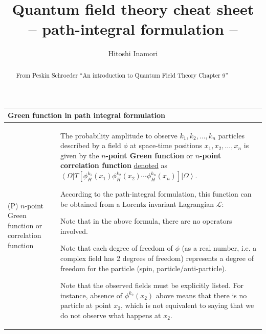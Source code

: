 \documentclass[11pt,amsmath,amssymb,latexsym]{article}
\newcommand{\toshTableBegin} 			{\begin{tabular}{|p{5cm}|p{11cm}|}}
\newcommand{\toshTableEnd} 				{\hline \end{tabular}}
\newcommand{\toshTableTitle}[1] 	{\hline \multicolumn{2}{|l|}{{\bf{#1}}}\\ \hline}
\newcommand{\toshProperty}[2]			{\hline (P) {#1} & {#2} \\}
\newcommand{\toshDef}[1]				{{\textbf{#1}}}
\newcommand{\toshD}							{{\mathcal{D}}}
\newcommand{\toshL}							{{\mathcal{L}}}
\newcommand{\bra}[1]{\left<{#1}\right|}
\newcommand{\ket}[1]{\left|{#1}\right>}
\begin{document}
\title{Quantum field theory cheat sheet\\ -- path-integral formulation -- }
\author{Hitoshi Inamori}
\maketitle
\begin{abstract}
From Peskin Schroeder ``An introduction to Quantum Field Theory Chapter 9''
\end{abstract}



\toshTableBegin
\toshTableTitle{Green function in path integral formulation}
\toshProperty{$n$-point Green function or correlation function}{The probability amplitude to observe $k_1, k_2, \ldots, k_n$ particles described by a field $\phi$ at space-time positions $x_1, x_2, \ldots, x_n$ is given by the \toshDef{$n$-point Green function} or \toshDef{$n$-point correlation function} \underline{denoted} as $\bra{\Omega} T\left[ \phi_H^{k_1}(x_1)\phi_H^{k_2}(x_2)\cdots\phi_H^{k_n}(x_n)\right]\ket{\Omega}$. 

\smallskip

According to the path-integral formulation, this function can be obtained from a Lorentz invariant Lagrangian $\toshL$:

\bigskip

\quad \framebox{\quad$\displaystyle \frac{\displaystyle\int\toshD\phi\, \phi^{k_1}(x_1)\phi^{k_2}(x_2)\cdots\phi^{k_n}(x_n) \exp\left[i\int d^4 x \toshL(\phi,\partial_\mu \phi)\right]}{\displaystyle\int\toshD\phi\, \exp\left[i\int d^4 x \toshL(\phi,\partial_\mu \phi)\right]}$\quad}

\bigskip

Note that in the above formula, there are no operators involved.

\smallskip

Note that each degree of freedom of $\phi$ (as a real number, i.e. a complex field has 2 degrees of freedom) represents a degree of freedom for the particle (spin, particle/anti-particle). 

\smallskip

Note that the observed fields must be explicitly listed. For instance, absence of $\phi^{k_2}(x_2)$ above means that there is no particle at point $x_2$, which is not equivalent to saying that we do not observe what happens at $x_2$.
}
\toshTableEnd
\bigskip
\end{document}
